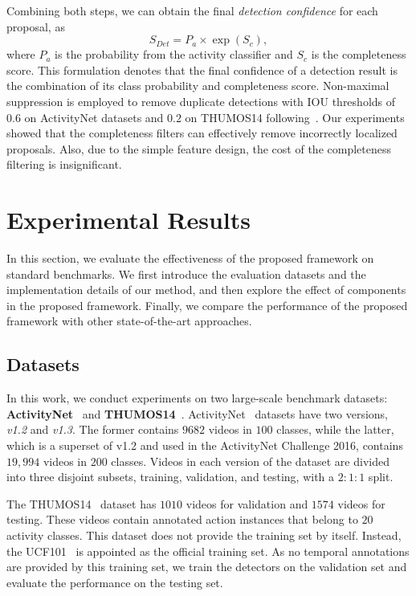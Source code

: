 \documentclass[10pt,twocolumn,letterpaper]{article}
\begin{document}
Combining both steps, we can obtain the final \emph{detection confidence} for each proposal, as 
\begin{equation}
	S_{Det} = P_{a} \times \exp(S_c),
\end{equation}
where $P_a$ is the probability from the activity classifier and $S_c$ is the completeness score.
This formulation denotes that the final confidence of a detection result is the combination of its class probability and completeness score.
Non-maximal suppression is employed to remove duplicate detections with IOU thresholds of $0.6$ on ActivityNet datasets and $ 0.2 $ on THUMOS14 following~\cite{Shou2016SCNN}.
Our experiments showed that the completeness filters can effectively remove 
incorrectly localized proposals.
Also, due to the simple feature design, the cost of the completeness filtering is insignificant.

 
\section{Experimental Results}
\label{sec:experiment}

In this section, we evaluate the effectiveness of the proposed framework on standard benchmarks.
We first introduce the evaluation datasets and the implementation details of our method, 
and then explore the effect of components in the proposed framework.
Finally, we compare the performance of the proposed framework with other state-of-the-art approaches.

\subsection{Datasets}

In this work, we conduct experiments on two large-scale benchmark datasets:
\textbf{ActivityNet}~\cite{caba2015activitynet} and
\textbf{THUMOS14}~\cite{Jiang2014THUMOS14}.
ActivityNet~\cite{caba2015activitynet} datasets have two versions, \emph{v1.2} and \emph{v1.3}.
The former contains $9682$ videos in $100$ classes, while the latter, which is a superset of v1.2 and used in the ActivityNet Challenge 2016, contains $19,994$ videos in $200$ classes.
Videos in each version of the dataset are divided into three disjoint subsets,
training, validation, and testing, with a $2:1:1$ split.


The THUMOS14~\cite{Jiang2014THUMOS14} dataset has $1010$ videos for validation and $1574$ videos for testing.
These videos contain annotated action instances that belong to $20$ activity classes. 
This dataset does not provide the training set by itself.
Instead, the UCF101~\cite{Soomro2012Ucf101} is appointed as the official training set.
As no temporal annotations are provided by this training set, 
we train the detectors on the validation set and evaluate the performance 
on the testing set.
\end{document}
